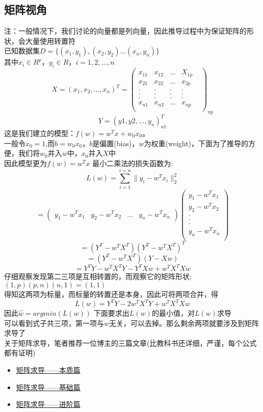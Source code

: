 \documentclass{report}
\begin{document}
\subsection{矩阵视角}
注：一般情况下，我们讨论的向量都是列向量，因此推导过程中为保证矩阵的形状，会大量使用转置符\\
已知数据集$D=\{(x_1,y_1),(x_2,y_2)...(x_n,y_n)\}$\\
其中$x_i\in R^p，y_i\in R，i=1,2,...,n$\\
$$
X=(x_1,x_2,...,x_n)^T=\begin{pmatrix}
x_{11}&x_{12}&...&X_{1p}\\
x_{21}&x_{22}&...&x_{2p}\\
.&.&.&.&\\
.&.&.&.&\\
.&.&.&.&\\
x_{n1}&x_{n2}&...&x_{np}\\
\end{pmatrix}_{np}
$$
$$
Y=(y1,y2,...,y_n)_{n1}^T
$$
这是我们建立的模型：$f(w)=w^Tx+w_0x_0。$\\
一般令$x_0=1$,而$b=w_0x_0$，$b$是偏置(bias)，$w$为权重(weight)，下面为了推导的方便，我们将$w_0$并入$w$中，$x_0$并入$X$中\\
因此模型更为$f(w)=w^Tx$
最小二乘法的损失函数为:
$$
L(w)=\sum_{i=1}^{i=n}\|y_i-w^T x_i\|_2^2
$$
$$
=\begin{pmatrix}
y_1-w^Tx_1&y_2-w^Tx_2&...&y_n-w^Tx_n
\end{pmatrix}
\begin{pmatrix}
y_1-w^Tx_1\\
y_2-w^Tx_2\\
.\\
.\\
.\\
y_n-w^Tx_n\\
\end{pmatrix}
$$
$$
=(Y^T-w^TX^T)(Y^T-w^TX^T)^T
$$
$$
=(Y^T-w^TX^T)(Y-Xw)
$$
$$
=Y^TY-w^TX^TY-Y^TXw+w^TX^TXw
$$
仔细观察发现第二三项是互相转置的，而观察它的矩阵形状: $(1,p)(p,n)(n,1)=(1,1)$\\
得知这两项为标量，而标量的转置还是本身，因此可将两项合并，得
$$
L(w)=Y^TY-2w^TX^TY+w^TX^TXw
$$
因此$\hat{w}=argmin(L(w))$
下面要求出$L(w)$的最小值，对$L(w)$求导\\
可以看到式子共三项，第一项与$w$无关，可以去掉。那么剩余两项就要涉及到矩阵求导了\\
关于矩阵求导，笔者推荐一位博主的三篇文章(比教科书还详细，严谨，每个公式都有证明)
\begin{itemize}
	\item \href{https://zhuanlan.zhihu.com/p/263777564}{矩阵求导——本质篇}
	\item \href{https://zhuanlan.zhihu.com/p/273729929}{矩阵求导——基础篇}
	\item \href{https://zhuanlan.zhihu.com/p/288541909}{矩阵求导——进阶篇}
\end{itemize}
\end{document}
